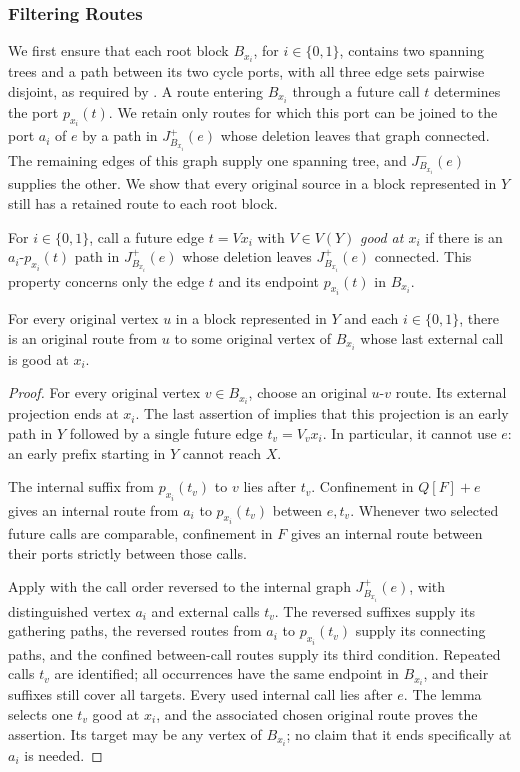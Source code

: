 \documentclass[USenglish, a4paper, thm-restate,numberwithinsect, cleveref]{lipics-v2021}
\begin{document}
\subsubsection{Filtering Routes}

We first ensure that each root block $B_{x_i}$, for $i\in\{0,1\}$,
contains two spanning trees and a path between its two cycle ports,
with all three edge sets pairwise disjoint, as required by
. A route entering $B_{x_i}$ through
a future call $t$ determines the port $p_{x_i}(t)$. We retain only
routes for which this port can be joined to the port $a_i$ of $e$ by
a path in $J_{B_{x_i}}^+(e)$ whose deletion leaves that graph connected.
The remaining edges of this graph supply one spanning tree, and
$J_{B_{x_i}}^-(e)$ supplies the other. We show that every original source in a
block represented in $Y$ still has a retained route to each root block.

For $i\in\{0,1\}$, call a future edge $t=Vx_i$ with $V\in V(Y)$
\emph{good at $x_i$} if there is an $a_i$-$p_{x_i}(t)$ path in $J_{B_{x_i}}^+(e)$ whose
deletion leaves $J_{B_{x_i}}^+(e)$ connected. This property concerns
only the edge $t$ and its endpoint $p_{x_i}(t)$ in $B_{x_i}$.

\begin{lemma}\label{lem:characterization-root-good-routes}
For every original vertex $u$ in a block represented in $Y$ and each
$i\in\{0,1\}$, there is an original route from $u$ to some original
vertex of $B_{x_i}$ whose last external call is good at $x_i$.
\end{lemma}
\begin{proof}
For every original vertex $v\in B_{x_i}$, choose an original
$u$-$v$ route. Its external projection ends at $x_i$.
The last assertion of  implies that
this projection is an early path in $Y$ followed by a single future
edge $t_v=V_vx_i$. In particular, it cannot use $e$: an early prefix
starting in $Y$ cannot reach $X$.

The internal suffix from $p_{x_i}(t_v)$ to $v$ lies after $t_v$.
Confinement in $Q[F]+e$ gives an internal route from $a_i$ to
$p_{x_i}(t_v)$ between $e,t_v$. Whenever two selected future calls
are comparable, confinement in $F$ gives an internal route between
their ports strictly between those calls.

Apply  with the call order reversed to the
internal graph $J_{B_{x_i}}^+(e)$, with distinguished vertex $a_i$
and external calls $t_v$. The reversed suffixes supply its gathering
paths, the reversed routes from $a_i$ to $p_{x_i}(t_v)$ supply its connecting paths,
and the confined between-call routes supply its third condition.
Repeated calls $t_v$ are identified; all occurrences have the same
endpoint in $B_{x_i}$, and their suffixes still cover all targets.
Every used internal call lies after $e$. The lemma selects one
$t_v$ good at $x_i$, and the associated chosen original route proves
the assertion. Its target may be any vertex of $B_{x_i}$; no claim
that it ends specifically at $a_i$ is needed.
\end{proof}
\end{document}
